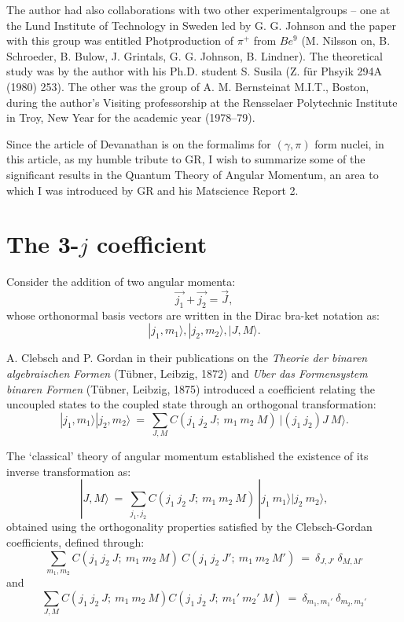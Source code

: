 The author had also collaborations with two other experimental\break groups -- one at the Lund Institute of Technology in Sweden led by G. G. Johnson and the paper with this group was  entitled Photproduction of $\pi^+$ from $Be^9$ (M. Nilsson on, B. Schroeder, B. Bulow, J. Grintals, G. G. Johnson, B. Lindner). The theoretical study was by the author with his Ph.D. student S. Susila (Z. für Phsyik 294A (1980) 253). The other was the group of A. M. Bernsteinat M.I.T., Boston, during the author's Visiting professorship at the Rensselaer Polytechnic Institute in Troy, New Year for the academic year (1978--79).

Since the article of Devanathan is on the formalims for $(\gamma,\pi)$ form nuclei, in this article, as my humble tribute to GR, I wish to summarize some of the significant results in the Quantum Theory of Angular Momentum, an area to which I was introduced by GR and his Matscience Report 2.

\section*{The 3-$j$ coefficient}

Consider the addition of two angular momenta:
\makeatletter
{}
\makeatother
\begin{equation}
\vec{j_1} + \vec{j_2} = \vec{J}, \label{chap7-eq1} 
\end{equation}
whose orthonormal basis vectors are written in the Dirac bra-ket notation as:
\begin{equation} 
|j_1,m_1\rangle , |j_2,m_2\rangle, |J,M\rangle. \label{chap7-eq2}
\end{equation}

A. Clebsch and P. Gordan in their publications on the \textit{Theorie der binaren algebraischen Formen} (Tübner, Leibzig, 1872) and \textit{Uber das Formensystem binaren Formen} (Tübner, Leibzig, 1875) introduced a coefficient relating the uncoupled states to the coupled state through an orthogonal transformation:
\begin{equation}
|j_1,m_1\rangle|j_2,m_2\rangle\ =\ \sum_{J,M} C(j_1\ j_2\ J;\ m_1\ m_2\ M)\ |(j_1\ j_2)J\ M\rangle. \label{chap7-eq3}
\end{equation}

The `classical' theory of angular momentum established the existence of its inverse transformation as:
\begin{equation}
|J,M\rangle\ =\ \sum_{j_1,j_2} C(j_1\ j_2\ J;\ m_1\ m_2\ M)\ |j_1\ m_1\rangle |j _2\  m_2\rangle, \label{chap7-eq4}
\end{equation}
obtained using the orthogonality properties satisfied by the Clebsch-Gordan coefficients, defined through:
\begin{equation}
\sum_{m_1,m_2} C(j_1\ j_2\ J;\ m_1\ m_2\ M)\ C(j_1\ j_2\ J';\ m_1\ m_2\ M')\ =\ \delta_{J,J'}\ \delta_{M,M'} \label{chap7-eq5}
\end{equation}
and
\begin{equation}
\sum_{J,M} C(j_1\ j_2\ J;\ m_1\ m_2\ M)C(j_1\ j_2\ J;\ m_1'\ m_2'\ M)\ =\ \delta_{m_1,m_1'} \ \delta_{m_2,m_2'} \label{chap7-eq6}
\end{equation}

